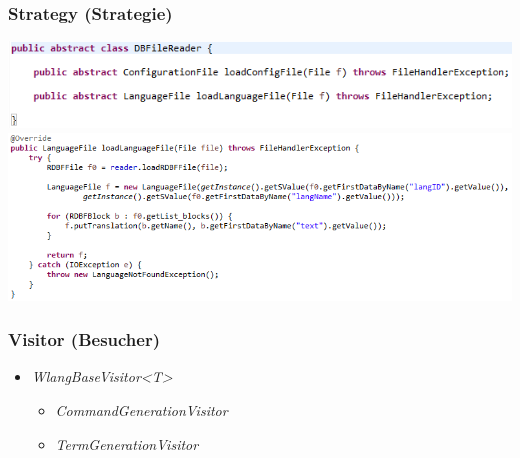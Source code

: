 \documentclass{beamer}
\begin{document}
\begin{frame}
\frametitle{Strategy (Strategie)}
\includegraphics[scale=0.5]{../document_data/loadLangFileAbstract.png}
\includegraphics[scale=0.5]{../document_data/loadLangFile.png}
\end{frame}

\begin{frame}
\frametitle{Visitor (Besucher)}
\begin{itemize}
\item \textit{WlangBaseVisitor<T>}
\begin{itemize}
\item \textit{CommandGenerationVisitor}
\item \textit{TermGenerationVisitor}
\end{itemize}
\end{itemize}
\end{frame}
\end{document}
